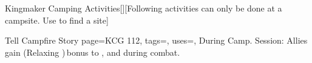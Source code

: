 \begin{PageFront}
\begin{Tables}{\frontTableHeight}
\begin{Table}{Kingmaker Camping Activities}[][Following activities can only be done at a campsite. Use
         to find a site]
\begin{entry}{Tell Campfire Story}
{                page=KCG 112,
                tags=\Concentrate, %
                uses=\Performance,
            }
                During Camp. Session: Allies gain (Relaxing )\,\Status bonus to ,  and  during combat.
                \\ \hfill{}\hfill {}
            \end{entry}
        \end{Table}
    \end{Tables}%
\end{PageFront}